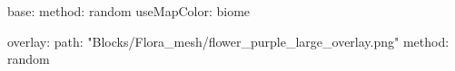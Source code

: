 base:
  method: random
  useMapColor: biome

overlay:
  path: "Blocks/Flora_mesh/flower_purple_large_overlay.png"
  method: random